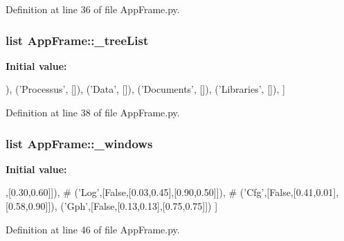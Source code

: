 Definition at line 36 of file AppFrame.py.\hypertarget{namespaceAppFrame_a3b7bebaeef2542cd239ab8792c383770}{
\subsubsection[{\_\-treeList}]{\setlength{\rightskip}{0pt plus 5cm}list {\bf AppFrame::\_\-treeList}}}
\label{namespaceAppFrame_a3b7bebaeef2542cd239ab8792c383770}
{\bfseries Initial value:}
\begin{DoxyCode}
[
    ('Elements',  []),
    ('Processus', []),
    ('Data',      []),
    ('Documents', []),
    ('Libraries', []),
]
\end{DoxyCode}


Definition at line 38 of file AppFrame.py.\hypertarget{namespaceAppFrame_a0e529303fab3d8cdf9ba8bee04b01fe3}{
\subsubsection[{\_\-windows}]{\setlength{\rightskip}{0pt plus 5cm}list {\bf AppFrame::\_\-windows}}}
\label{namespaceAppFrame_a0e529303fab3d8cdf9ba8bee04b01fe3}
{\bfseries Initial value:}
\begin{DoxyCode}
[
            ('App',[True,[0.01,0.04],[0.30,0.60]]),
#            ('Log',[False,[0.03,0.45],[0.90,0.50]]),
#            ('Cfg',[False,[0.41,0.01],[0.58,0.90]]),
            ('Gph',[False,[0.13,0.13],[0.75,0.75]])
            ]
\end{DoxyCode}


Definition at line 46 of file AppFrame.py.